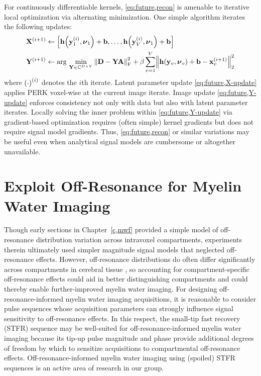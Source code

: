 {For continuously differentiable kernels,
\eqref{eq:future,recon} is amenable 
to iterative local optimization 
via alternating minimization.
One simple algorithm iterates
the following updates:
\begin{align}
	\iter{\bmX}{i+1} &\gets
		\brac{%
			\bmh\paren{\iter{\bmy}{i}_1,\bmnu_1}+\bmb,
			\dots,
			\bmh\paren{\iter{\bmy}{i}_V,\bmnu_1}+\bmb
		}%
		\label{eq:future,X-update}
		\\
	\iter{\bmY}{i+1} &\gets
		\argmin{%
			\bmY \in \complexes{D \times V}
		}%
		\frob{\bmD-\bmY\bmA}^2 + 
			\beta \sum_{v=1}^V \norm{%
				\bmh\paren{\bmy_v,\bmnu_v}+\bmb-\iter{\bmx}{i+1}_v
			}^2_2%
		\label{eq:future,Y-update}		
\end{align}
where $\iter{\paren{\cdot}}{i}$ denotes the $i$th iterate.
Latent parameter update \eqref{eq:future,X-update}
applies PERK voxel-wise
at the current image iterate.
Image update \eqref{eq:future,Y-update}
enforces consistency 
not only with data
but also with latent parameter iterates.
Locally solving the inner problem 
within \eqref{eq:future,Y-update}
via gradient-based optimization
requires (often simple) kernel gradients
but does not require signal model gradients.
Thus, 
\eqref{eq:future,recon} or similar variations
may be useful even when analytical signal models
are cumbersome or altogether unavailable.
}%

\section{Exploit Off-Resonance for Myelin Water Imaging}
\label{s,future,off-res}

Though early sections in Chapter~\ref{c,mwf} 
provided a simple model  
of off-resonance distribution variation 
across intravoxel compartments,
experiments therein 
ultimately used simpler magnitude signal models
that neglected off-resonance effects.
However,
off-resonance distributions
do often differ significantly 
across compartments
in cerebral tissue \cite{miller:10:aot-1,miller:10:aot-2},
so accounting for compartment-specific off-resonance effects
could aid in better distinguishing compartments
and could thereby enable further-improved myelin water imaging.
For designing off-resonance-informed myelin water imaging acquisitions,
it is reasonable
to consider pulse sequences
whose acquisition parameters
can strongly influence signal sensitivity 
to off-resonance effects.
In this respect,
the small-tip fast recovery (STFR) sequence \cite{nielsen:13:stf}
may be well-suited for off-resonance-informed myelin water imaging
because its tip-up pulse magnitude and phase
provide additional degrees of freedom
by which to sensitize acquisitions
to compartmental off-resonance effects.
Off-resonance-informed myelin water imaging
using (spoiled) STFR sequences
is an active area of research 
in our group.

